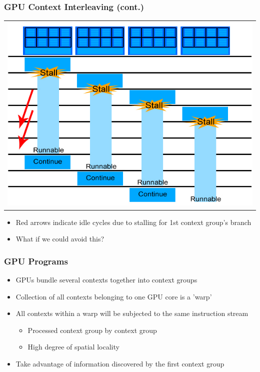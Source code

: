 \documentclass{beamer}
\begin{document}
\begin{frame}
	\frametitle{GPU Context Interleaving (cont.)}
	\begin{tabular}{c}
		\includegraphics[width=.75\textwidth]{GPU-context-interleaving-2.jpg}
	\end{tabular}
	\begin{itemize}
		\item Red arrows indicate idle cycles due to stalling for 1st context group's branch
		\item What if we could avoid this?
	\end{itemize}
\end{frame}

\begin{frame}
	\frametitle{GPU Programs}
	\begin{itemize}
		\item GPUs bundle several contexts together into context groups
		\item Collection of all contexts belonging to one GPU core is a 'warp'
		\item All contexts within a warp will be subjected to the same instruction stream
		\begin{itemize}
			\item Processed context group by context group
			\item High degree of spatial locality
		\end{itemize}
		\item Take advantage of information discovered by the first context group 
	\end{itemize}
\end{frame}
\end{document}
